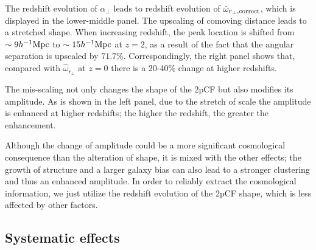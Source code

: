 \documentclass[iop]{emulateapj}
\begin{document}
The redshift evolution of $\alpha_{\perp}$ leads to redshift evolution of 
$\hat \omega_{r_\perp, \rm correct}$,
which is displayed in the lower-middle panel.
The upscaling of comoving distance leads to a stretched shape.
When increasing redshift,
the peak location is shifted from $\sim9h^{-1} \rm Mpc$ to $\sim15 h^{-1}\rm Mpc$ at $z=2$,
as a result of the fact that the angular separation is upscaled by $71.7\%$.
Correspondingly, the right panel shows that, 
compared with $\hat \omega_{r_\perp}$ at $z=0$ there is a 20-40\% change at higher redshifts.

The mis-scaling not only changes the shape of the 2pCF but also modifies its amplitude. %
As is shown in the left panel, due to the stretch of scale the amplitude is enhanced at higher redshifts;
the higher the redshift, the greater the enhancement.%

Although the change of amplitude could be a more significant cosmological consequence 
than the alteration of shape,
it is mixed with the other effects; 
the growth of structure and a larger galaxy bias can also lead to a stronger clustering and thus an enhanced amplitude.
In order to reliably extract the cosmological information, 
we just utilize the redshift evolution of the 2pCF shape, 
which is less affected by other factors.


\subsection{Systematic effects}
\end{document}
